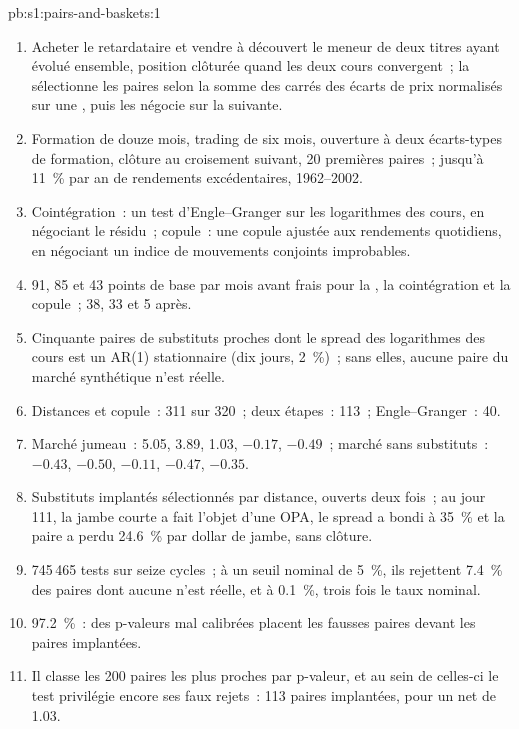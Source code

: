 \begin{solution}{pb:s1:pairs-and-baskets:1}
\begin{enumerate}
\item Acheter le retardataire et vendre à découvert le meneur de deux titres ayant évolué ensemble, position clôturée quand les deux cours convergent~; la  sélectionne les paires selon la somme des
carrés des écarts de prix normalisés sur une , puis les négocie sur la  suivante.
\item Formation de douze mois, trading de six mois, ouverture à deux écarts-types de formation, clôture au croisement suivant, 20 premières paires~; jusqu'à 11~\% par an de
rendements excédentaires, 1962--2002.
\item Cointégration~: un test d'Engle--Granger sur les logarithmes des cours, en négociant le résidu~; copule~: une copule ajustée aux rendements quotidiens, en négociant un indice de mouvements
conjoints improbables.
\item 91, 85 et 43 points de base par mois avant frais pour la , la cointégration et la copule~; 38, 33 et 5 après.
\item Cinquante paires de substituts proches dont le spread des logarithmes des cours est un AR(1) stationnaire (dix jours, 2~\%)~; sans elles, aucune paire du marché synthétique n'est réelle.
\item Distances et copule~: 311 sur 320~; deux étapes~: 113~; Engle--Granger~: 40.
\item Marché jumeau~: 5.05, 3.89, 1.03, $-0.17$, $-0.49$~; marché sans substituts~: $-0.43$, $-0.50$, $-0.11$, $-0.47$, $-0.35$.
\item Substituts implantés sélectionnés par distance, ouverts deux fois~; au jour 111, la jambe courte a fait l'objet d'une OPA, le spread a bondi à 35~\% et la paire a perdu 24.6~\% par
dollar de jambe, sans clôture.
\item 745\,465 tests sur seize cycles~; à un seuil nominal de 5~\%, ils rejettent 7.4~\% des paires dont aucune n'est réelle, et à 0.1~\%, trois fois le taux nominal.
\item 97.2~\%~: des p-valeurs mal calibrées placent les fausses paires devant les paires implantées.
\item Il classe les 200 paires les plus proches par p-valeur, et au sein de celles-ci le test privilégie encore ses faux rejets~: 113 paires implantées, pour un net de 1.03.

\end{enumerate}
\end{solution}
